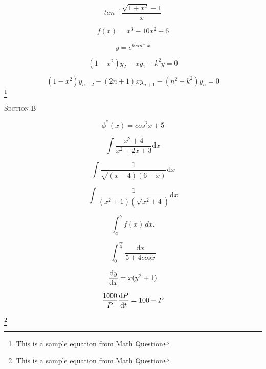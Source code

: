 \documentclass{article}
\begin{document}
\begin{equation}
    tan^{-1} \frac{\sqrt{1+x^2}-1}{x}
\end{equation}

\begin{equation}
    f(x)=x^3-10x^2+6
\end{equation}

\begin{equation}
    y=e^{k\,sin^{-1}x}
\end{equation}

\begin{equation}
    (1-x^2)y_2-xy_1-k^2y=0
\end{equation}

\begin{equation}
    (1-x^2)y_{n+2} -(2n+1)xy_{n+1}-(n^2+k^2)y_n=0
\end{equation}
\footnote{This is a sample equation from Math Question}
\newpage

\begin{center}
    \textsc{Section-B}
    \vspace{1mm}
    \hline
\end{center}

\begin{equation}
    \phi^{''}(x)=cos^2x+5
\end{equation}

\begin{equation}
    \int\frac{x^2+4}{x^2+2x+3} \mathrm{d}x
\end{equation}

\begin{equation}
    \int\frac{1}{\sqrt{(x-4)(6-x)}}\mathrm{d}x
\end{equation}

\begin{equation}
   \int \frac{1}{(x^2+1)(\sqrt{x^2+4})}\mathrm{d}x
\end{equation}

\begin{equation}
    \int_a^b f(x)\mathrm\,{d}x.
\end{equation}

\begin{equation}
    \int_0^{\frac{2\pi}{3}} \frac{\mathrm{d}x}{5+4cosx}
\end{equation}

\[
\diff{y}{x}=x(y^2+1)
\]

\begin{equation}
    \frac{1000}{P} \diff{P}{t}=100-P
\end{equation}

\footnote{This is a sample equation from Math Question}
\end{document}
